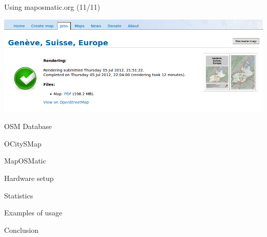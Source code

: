 \documentclass{beamer}
\begin{document}
\begin{frame}{Using maposmatic.org (11/11)}
  \begin{center}
    \includegraphics[width=\textwidth]{screenshot11.png}
  \end{center}
\end{frame}

\begin{frame}{OSM Database}

\end{frame}

\begin{frame}{OCitySMap}

\end{frame}

\begin{frame}{MapOSMatic}

\end{frame}

\begin{frame}{Hardware setup}

\end{frame}

\begin{frame}{Statistics}

\end{frame}

\begin{frame}{Examples of usage}

\end{frame}

\begin{frame}[t]{Conclusion}
\end{frame}
\end{document}
